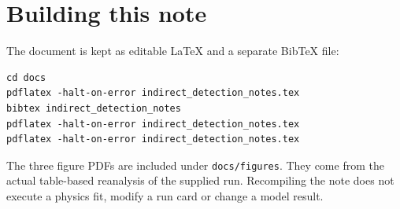 \documentclass[11pt,a4paper]{article}
\begin{document}
\section{Building this note}
The document is kept as editable LaTeX and a separate BibTeX file:
\begin{lstlisting}
cd docs
pdflatex -halt-on-error indirect_detection_notes.tex
bibtex indirect_detection_notes
pdflatex -halt-on-error indirect_detection_notes.tex
pdflatex -halt-on-error indirect_detection_notes.tex
\end{lstlisting}
The three figure PDFs are included under \texttt{docs/figures}. They come from the actual table-based reanalysis of the supplied run. Recompiling the note does not execute a physics fit, modify a run card or change a model result.



\end{document}
